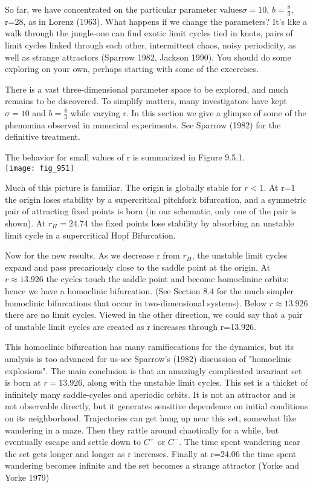 \documentclass{article}
\newcommand\tab[1][1cm]{\hspace*{#1}}
\begin{document}
So far, we have concentrated on the particular parameter values$\sigma = 10$, $b=\frac{8}{3}$, r=28, as in Lorenz (1963). What happens if we change the parameters? It's like a walk through the jungle-one can find exotic limit cycles tied in knots, pairs of limit cycles linked through each other, intermittent chaos, noisy periodicity, as well as strange attractors (Sparrow 1982, Jackson 1990). You should do some exploring on your own, perhaps starting with some of the excercises. \\ \tab

There is a vast three-dimensional parameter space to be explored, and much remains to be discovered. To simplify matters, many investigators have kept $\sigma = 10$ and $b=\frac{8}{3}$ while varying r. In this section we give a glimpse of some of the phenomina observed in numerical experiments. See Sparrow (1982) for the definitive treatment. \\ \tab

The behavior for small values of r is summarized in Figure 9.5.1. \\

\texttt{[image: fig\_951]}

Much of this picture is familiar. The origin is globally stable for $r<1$. At r=1 the origin loses stability by a supercritical pitchfork bifurcation, and a symmetric pair of attracting fixed points is born (in our schematic, only one of the pair is shown). At $r_{H}=24.74$ the fixed points lose stability by absorbing an unstable limit cycle in a supercritical Hopf Bifurcation. \\ \tab

Now for the new results. As we decrease r from $r_{H}$, the unstable limit cycles expand and pass precariously close to the saddle point at the origin. At $r \approx 13.926$ the cycles touch the saddle point and become homoclininc orbits: hence we have a homoclinic bifurcation. (See Section 8.4 for the much simpler homoclinic bifurcations that occur in two-dimensional systems). Below $r \approx 13.926$ there are no limit cycles. Viewed in the other direction, we could say that a pair of unstable limit cycles are created as r increases through r=13.926. \\ \tab

This homoclinic bifurcation has many ramificcations for the dynamics, but its analysis is too advanced for us-see Sparrow's (1982) discussion of "homoclinic explosions". The main conclusion is that an amazingly complicated invariant set is born at $r = 13.926$, along with the unstable limit cycles. This set is a thicket of infinitely many saddle-cycles and aperiodic orbits. It is not an attractor and is not observable directly, but it generates sensitive dependence on initial conditions on its neighborhood. Trajectories can get hung up near this set, somewhat like wandering in a maze. Then they rattle around chaotically for a while, but eventually escape and settle down to $C^{+}$ or $C^{-}$. The time spent wandering near the set gets longer and longer as r increases. Finally at r=24.06 the time spent wandering becomes infinite and the set becomes a strange attractor (Yorke and Yorke 1979) 
\end{document}
